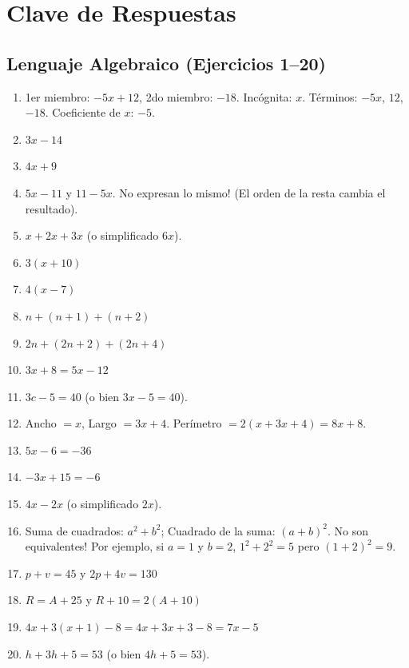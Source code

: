 \documentclass[12pt, letterpaper]{article}
\begin{document}
\newpage

\ifmwclaves
  \section{Clave de Respuestas}

  \subsection*{Lenguaje Algebraico (Ejercicios 1--20)}

  \begin{enumerate}[leftmargin=*, label=\textbf{\arabic*.}]
    \item 1er miembro: $-5x + 12$, 2do miembro: $-18$. Incógnita: $x$. Términos: $-5x$, $12$, $-18$. Coeficiente de $x$: $-5$.
    \item $3x - 14$
    \item $4x + 9$
    \item $5x - 11$ y $11 - 5x$. \textquestiondown No expresan lo mismo! (El orden de la resta cambia el resultado).
    \item $x + 2x + 3x$ (o simplificado $6x$).
    \item $3(x + 10)$
    \item $4(x - 7)$
    \item $n + (n + 1) + (n + 2)$
    \item $2n + (2n + 2) + (2n + 4)$
    \item $3x + 8 = 5x - 12$
    \item $3c - 5 = 40$ (o bien $3x - 5 = 40$).
    \item Ancho $= x$, Largo $= 3x + 4$. Perímetro $= 2(x + 3x + 4) = 8x + 8$.
    \item $5x - 6 = -36$
    \item $-3x + 15 = -6$
    \item $4x - 2x$ (o simplificado $2x$).
    \item Suma de cuadrados: $a^2 + b^2$; Cuadrado de la suma: $(a + b)^2$. \textquestiondown No son equivalentes! Por ejemplo, si $a=1$ y $b=2$, $1^2+2^2=5$ pero $(1+2)^2=9$.
    \item $p + v = 45$ \quad y \quad $2p + 4v = 130$
    \item $R = A + 25$ \quad y \quad $R + 10 = 2(A + 10)$
    \item $4x + 3(x + 1) - 8 = 4x + 3x + 3 - 8 = 7x - 5$
    \item $h + 3h + 5 = 53$ \quad (o bien $4h + 5 = 53$).
  \end{enumerate}
\end{document}
